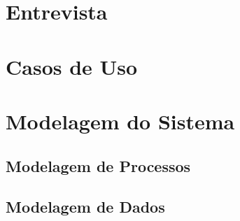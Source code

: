 \section{Entrevista}


\section{ Casos de Uso}



\section{Modelagem do Sistema}


\subsection{Modelagem de Processos}


\subsection{Modelagem de Dados}

